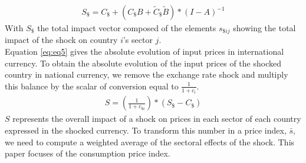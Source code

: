 \documentclass[11pt,a4paper]{article}
\begin{document}
 \begin{eqnarray}
{{S}_{\$}}={{C}_{\$}}+({{C}_{\$}}B+{{\tilde{C}}_{\$}}\tilde{B})*{{(I-A)}^{-1}}	
\label{eq:eq5}
 \end{eqnarray}
With ${{S}_{\$}}$ the total impact vector composed of the elements ${{{s}}_{\$ij}}$ showing the total impact of the shock on country $i$'s sector $j$. \\
Equation \ref{eq:eq5} gives the absolute evolution of input prices in international currency. To obtain the absolute evolution of the input prices of the shocked country in national currency, we remove the exchange rate shock and multiply this balance by the scalar of conversion equal to $\frac{1}{1+c_i}$.
\begin{eqnarray*}
	S=\left( \frac{1}{1+{{c}_{\$i}}}\right)*\left({{S}_{\$}}-{{C}_{\$}}\right)
\end{eqnarray*}
$S$ represents the overall impact of a shock on prices in each sector of each country expressed in the shocked currency. To transform this number in a price index, $\bar{s}$, we need to compute a weighted average of the sectoral effects of the shock. This paper focuses of the consumption price index.
\end{document}
